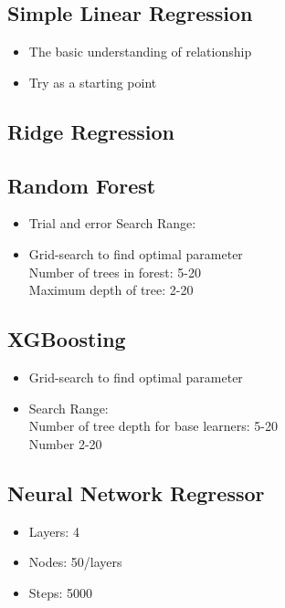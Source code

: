 \documentclass[journal]{IEEEtran}
\begin{document}
\subsection{Simple Linear Regression}
\begin{itemize}
\item{The basic understanding of relationship}
\item{Try as a starting point}
\end{itemize}
\subsection{Ridge Regression}
\subsection{Random Forest}
\begin{itemize}
\item{Trial and error Search Range:}
\item{Grid-search to find optimal parameter} \\
Number of trees in forest: 5-20 \\
Maximum depth of tree: 2-20
\end{itemize}
\subsection{XGBoosting}
\begin{itemize}
\item{Grid-search to find optimal parameter}
\item{Search Range:} \\
Number of tree depth for base learners: 5-20\\
Number 2-20
\end{itemize}
\subsection{Neural Network Regressor}
\begin{itemize}
\item{Layers: 4}
\item{Nodes: 50/layers}
\item{Steps: 5000}
\end{itemize}
\end{document}
